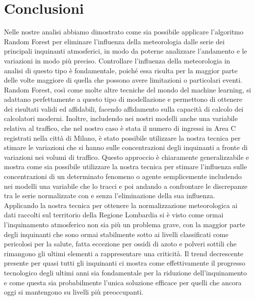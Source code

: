 \chapter{Conclusioni}
Nelle nostre analisi abbiamo dimostrato come sia possibile applicare l'algoritmo Random Forest per eliminare l'influenza della meteorologia dalle serie dei principali inquinanti atmosferici, in modo da poterne analizzare l'andamento e le variazioni in modo più preciso.  
Controllare l'influenza della meteorologia in analisi di questo tipo è fondamentale, poiché essa risulta per la maggior parte delle volte maggiore di quella che possono avere limitazioni o particolari eventi. Random Forest, così come molte altre tecniche del mondo del machine learning, si adattano perfettamente a questo tipo di modellazione e permettono di ottenere dei risultati validi ed affidabili, facendo affidamento sulla capacità di calcolo dei calcolatori moderni.  
Inoltre, includendo nei nostri modelli anche una variabile relativa al traffico, che nel nostro caso è stata il numero di ingressi in Area C registrati nella città di Milano, è stato possibile utilizzare la nostra tecnica per stimare le variazioni che si hanno sulle concentrazioni degli inquinanti a fronte di variazioni nei volumi di traffico. Questo approccio è chiaramente generalizzabile e mostra come sia possibile utilizzare la nostra tecnica per stimare l'influenza sulle concentrazioni di un determinato fenomeno o agente semplicemente includendo nei modelli una variabile che lo tracci e poi andando a confrontare le discrepanze tra le serie normalizzate con e senza l'eliminazione della sua influenza.
Applicando la nostra tecnica per ottenere la normalizzazione meteorologica ai dati raccolti sul territorio della Regione Lombardia si è visto come ormai l'inquinamento atmosferico non sia più un problema grave, con la maggior parte degli inquinanti che sono ormai stabilmente sotto ai livelli classificati come pericolosi per la salute, fatta eccezione per ossidi di azoto e polveri sottili che rimangono gli ultimi elementi a rappresentare una criticità. 
Il trend decrescente presente per quasi tutti gli inquinanti ci mostra come effettivamente il progresso tecnologico degli ultimi anni sia fondamentale per la riduzione dell'inquinamento e come questa sia probabilmente l'unica soluzione efficace per quelli che ancora oggi si mantengono su livelli più preoccupanti.  
